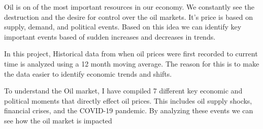 Oil is on of the most important resources in our economy. We constantly see the destruction and the desire for control over the oil markets. It’s price is based on supply, demand, and political events. Based on this idea we can identify key important events based of sudden increases and decreases in trends.

In this project, Historical data from when oil prices were first recorded to current time is analyzed using a 12 month moving average. The reason for this is to make the data easier to identify economic trends and shifts.

To understand the Oil market, I have compiled 7 different key economic and political moments that directly effect oil prices. This includes oil supply shocks, financial crises, and the COVID-19 pandemic. By analyzing these events we can see how the oil market is impacted
